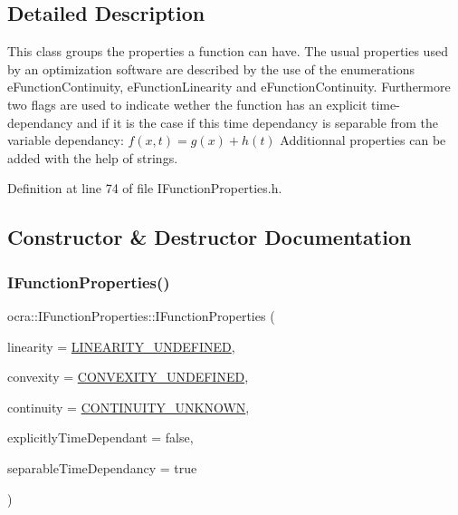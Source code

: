 \subsection{Detailed Description}
This class groups the properties a function can have. The usual properties used by an optimization software are described by the use of the enumerations e\+Function\+Continuity, e\+Function\+Linearity and e\+Function\+Continuity. Furthermore two flags are used to indicate wether the function has an explicit time-\/dependancy and if it is the case if this time dependancy is separable from the variable dependancy\+: $ f(x,t) = g(x)+h(t)$ Additionnal properties can be added with the help of strings. 

Definition at line 74 of file I\+Function\+Properties.\+h.



\subsection{Constructor \& Destructor Documentation}
\hypertarget{classocra_1_1IFunctionProperties_aee18136916b7dea9df2573cea45464ca}{}\label{classocra_1_1IFunctionProperties_aee18136916b7dea9df2573cea45464ca} 
\subsubsection{\texorpdfstring{I\+Function\+Properties()}{IFunctionProperties()}}
{\footnotesize\ttfamily ocra\+::\+I\+Function\+Properties\+::\+I\+Function\+Properties (\begin{DoxyParamCaption}\item[{\hyperlink{namespaceocra_a87b525b5508b0f6e9d931f14c7c226ab}{e\+Function\+Linearity}}]{linearity = {\ttfamily \hyperlink{namespaceocra_a87b525b5508b0f6e9d931f14c7c226abadd86a2dd3240e6df49a6e422b5abe075}{L\+I\+N\+E\+A\+R\+I\+T\+Y\+\_\+\+U\+N\+D\+E\+F\+I\+N\+ED}},  }\item[{\hyperlink{namespaceocra_ae6e8dca6121e9618486a449754876119}{e\+Function\+Convexity}}]{convexity = {\ttfamily \hyperlink{namespaceocra_ae6e8dca6121e9618486a449754876119a40aab88792841afe151808f879cfaa99}{C\+O\+N\+V\+E\+X\+I\+T\+Y\+\_\+\+U\+N\+D\+E\+F\+I\+N\+ED}},  }\item[{int}]{continuity = {\ttfamily \hyperlink{namespaceocra_ae5102ad1959d0c0dbf2eaa5610bbf728ad66557aadcf8856f9f135ff26db1a862}{C\+O\+N\+T\+I\+N\+U\+I\+T\+Y\+\_\+\+U\+N\+K\+N\+O\+WN}},  }\item[{bool}]{explicitly\+Time\+Dependant = {\ttfamily false},  }\item[{bool}]{separable\+Time\+Dependancy = {\ttfamily true} }\end{DoxyParamCaption})\hspace{0.3cm}{\ttfamily [protected]}}



